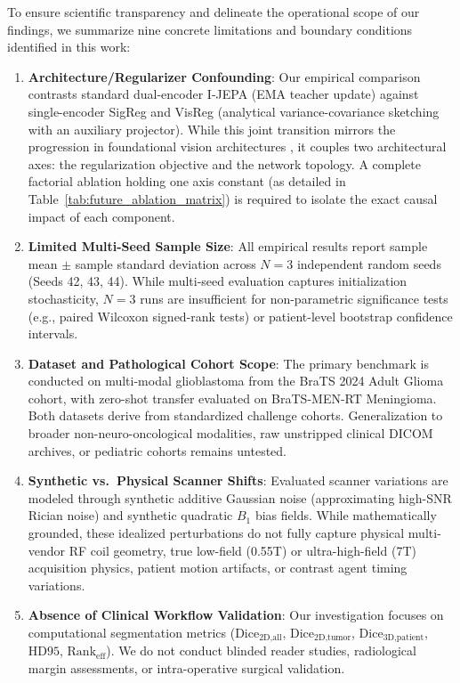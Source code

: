 \documentclass{article}
\begin{document}
To ensure scientific transparency and delineate the operational scope of our findings, we summarize nine concrete limitations and boundary conditions identified in this work:
\begin{enumerate}
    \item \textbf{Architecture/Regularizer Confounding}: Our empirical comparison contrasts standard dual-encoder I-JEPA (EMA teacher update) against single-encoder SigReg and VisReg (analytical variance-covariance sketching with an auxiliary projector). While this joint transition mirrors the progression in foundational vision architectures \citep{assran2023ijepa,balestriero2025lejepa,wu2026visreg}, it couples two architectural axes: the regularization objective and the network topology. A complete factorial ablation holding one axis constant (as detailed in Table~\ref{tab:future_ablation_matrix}) is required to isolate the exact causal impact of each component.
    \item \textbf{Limited Multi-Seed Sample Size}: All empirical results report sample mean $\pm$ sample standard deviation across $N=3$ independent random seeds (Seeds 42, 43, 44). While multi-seed evaluation captures initialization stochasticity, $N=3$ runs are insufficient for non-parametric significance tests (e.g., paired Wilcoxon signed-rank tests) or patient-level bootstrap confidence intervals.
    \item \textbf{Dataset and Pathological Cohort Scope}: The primary benchmark is conducted on multi-modal glioblastoma from the BraTS 2024 Adult Glioma cohort, with zero-shot transfer evaluated on BraTS-MEN-RT Meningioma. Both datasets derive from standardized challenge cohorts. Generalization to broader non-neuro-oncological modalities, raw unstripped clinical DICOM archives, or pediatric cohorts remains untested.
    \item \textbf{Synthetic vs.\ Physical Scanner Shifts}: Evaluated scanner variations are modeled through synthetic additive Gaussian noise (approximating high-SNR Rician noise) and synthetic quadratic $B_1$ bias fields. While mathematically grounded, these idealized perturbations do not fully capture physical multi-vendor RF coil geometry, true low-field (0.55T) or ultra-high-field (7T) acquisition physics, patient motion artifacts, or contrast agent timing variations.
    \item \textbf{Absence of Clinical Workflow Validation}: Our investigation focuses on computational segmentation metrics ($\text{Dice}_{\text{2D,all}}$, $\text{Dice}_{\text{2D,tumor}}$, $\text{Dice}_{\text{3D,patient}}$, $\text{HD95}$, $\text{Rank}_{\text{eff}}$). We do not conduct blinded reader studies, radiological margin assessments, or intra-operative surgical validation.

\end{enumerate}
\end{document}
